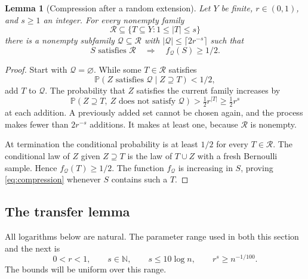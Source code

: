 \documentclass[11pt]{article}
\newtheorem{lemma}[theorem]{Lemma}
\theoremstyle{remark}
\numberwithin{equation}{section}
\newcommand{\Prob}{\mathbb P}
\newcommand{\calQ}{\mathcal Q}
\newcommand{\calR}{\mathcal R}
\begin{document}
\begin{lemma}[Compression after a random extension]
\label{lem:compression}
Let $Y$ be finite, $r\in(0,1)$, and $s\geq1$ an integer.
For every nonempty family
\[
 \calR\subseteq\{T\subseteq Y:1\leq|T|\leq s\}
\]
there is a nonempty subfamily $\calQ\subseteq\calR$ with
$|\calQ|\leq\lceil2r^{-s}\rceil$ such that
\begin{equation}\label{eq:compression}
 S\text{ satisfies }\calR\quad\Longrightarrow\quad
 f_{\calQ}(S)\geq1/2.
\end{equation}
\end{lemma}
\begin{proof}
Start with $\calQ=\varnothing$. While some $T\in\calR$
satisfies
\[
 \Prob(Z\text{ satisfies }\calQ\mid Z\supseteq T)<1/2,
\]
add $T$ to $\calQ$. The probability that $Z$ satisfies the
current family increases by
\[
 \Prob(Z\supseteq T,\ Z\text{ does not satisfy }\calQ)
 >\tfrac12r^{|T|}\geq\tfrac12r^s
\]
at each addition. A previously added set cannot be chosen again,
and the process makes fewer than $2r^{-s}$ additions. It makes
at least one, because $\calR$ is nonempty.

At termination the conditional probability is at least $1/2$
for every $T\in\calR$. The conditional law of $Z$ given
$Z\supseteq T$ is the law of $T\cup Z$ with a fresh Bernoulli
sample. Hence $f_{\calQ}(T)\geq1/2$. The function
$f_{\calQ}$ is increasing in $S$, proving
\eqref{eq:compression} whenever $S$ contains such a $T$.
\end{proof}

\subsection{The transfer lemma}

All logarithms below are natural. The parameter range used in both
this section and the next is
\begin{equation}\label{eq:parameters}
 0<r<1,\qquad s\in\mathbb N,\qquad
 s\leq10\log n,\qquad r^s\geq n^{-1/100}.
\end{equation}
The bounds will be uniform over this range.
\end{document}
